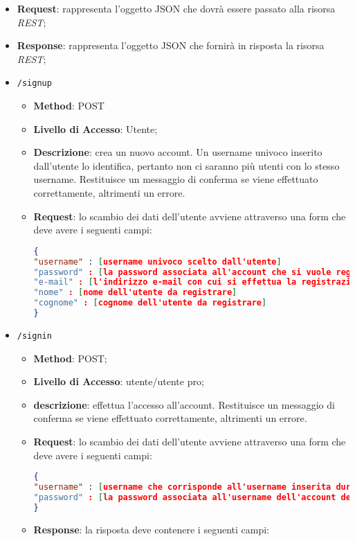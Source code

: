 \begin{itemize}
	\item \textbf{Request}: rappresenta l'oggetto JSON che dovrà essere passato alla risorsa \textit{REST};
	\item \textbf{Response}: rappresenta l'oggetto JSON che fornirà in risposta la risorsa \textit{REST};
	\item \texttt{/signup}
		\begin{itemize}
			\item \textbf{Method}: POST
			\item \textbf{Livello di Accesso}: Utente;
			\item \textbf{Descrizione}: crea un nuovo account. Un username univoco inserito dall'utente lo identifica, pertanto non ci saranno più utenti con lo stesso username. Restituisce un messaggio di conferma se viene effettuato correttamente, altrimenti un errore.
			\item \textbf{Request}: lo scambio dei dati dell'utente avviene attraverso una form che deve avere i seguenti campi:
\begin{lstlisting}[language=json,firstnumber=1]
{
"username" : [username univoco scelto dall'utente]
"password" : [la password associata all'account che si vuole registrare]
"e-mail" : [l'indirizzo e-mail con cui si effettua la registrazione]
"nome" : [nome dell'utente da registrare]
"cognome" : [cognome dell'utente da registrare]
}
\end{lstlisting}
		\end{itemize}
	\item \texttt{/signin}
		\begin{itemize}
			\item \textbf{Method}: POST;
			\item \textbf{Livello di Accesso}: utente/utente pro;
			\item \textbf{descrizione}: effettua l'accesso all'account. Restituisce un messaggio di conferma se viene effettuato correttamente, altrimenti un errore.
			\item \textbf{Request}: lo scambio dei dati dell'utente avviene attraverso una form che deve avere i seguenti campi:
\begin{lstlisting}[language=json,firstnumber=1]
{
"username" : [username che corrisponde all'username inserita durante la registrazione]
"password" : [la password associata all'username dell'account dell'utente]
}
\end{lstlisting}
			\item \textbf{Response}: la risposta deve contenere i seguenti campi:

\end{itemize}
\end{itemize}
